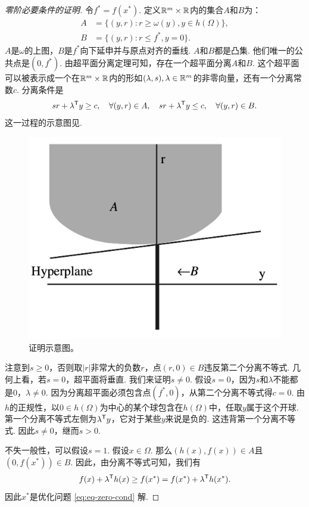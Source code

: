\begin{proof}[零阶必要条件的证明]
令$f^\ast=f({x^\ast})$. 定义$\mathbb{R}^m\times\mathbb{R}$内的集合$A$和$B$为：
\begin{align*}
    A&=\{(y,r):r\ge \omega({y}),{y}\in h(\Omega)\},\\ 
    B&=\{(y,r):r\le f^\ast,y=0\}.
\end{align*}
$A$是$\omega$的上图，$B$是$f^\ast$向下延申并与原点对齐的垂线. $A$和$B$都是凸集. 他们唯一的公共点是$(0,f^\ast)$. 由超平面分离定理可知，存在一个超平面分离$A$和$B$. 这个超平面可以被表示成一个在$\mathbb{R}^m\times\mathbb{R}$内的形如$(\lambda,s),\lambda\in \mathbb{R}^{m}$的非零向量，还有一个分离常数$c$. 分离条件是$$sr+{\lambda^{\mathsf{T}} y}\ge c,\quad\forall(y,r)\in A,\quad sr+{\lambda^{\mathsf{T}} y}\le c,\quad\forall(y,r)\in B.$$ 
这一过程的示意图见.

\begin{figure}[ht]
    \centering
    \includegraphics[scale=0.3]{Chapters/duality/figures/sep-hyperplane-eq.png}
    \caption{证明示意图。}
    \label{fig:sep-hyperplane-eq}
\end{figure}

注意到$s\ge 0$，否则取$|r|$非常大的负数$r$，点$(r,{0})\in B$违反第二个分离不等式. 几何上看，若$s=0$，超平面将垂直. 我们来证明$s\neq 0$. 假设$s=0$，因为$s$和${\lambda}$不能都是$0$，${\lambda\neq 0}$. 因为分离超平面必须包含点$(f^\ast,{0})$，从第二个分离不等式得$c=0$. 由$h$的正规性，以${0\in h(\Omega)}$为中心的某个球包含在$h(\Omega)$中，任取$y$属于这个开球. 第一个分离不等式左侧为${\lambda^{\mathsf{T}} y}$，它对于某些${y}$来说是负的. 这违背第一个分离不等式. 因此$s\neq 0$，继而$s>0$. 

不失一般性，可以假设$s=1$. 假设$x\in\Omega$. 那么$(h(x),f(x))\in A$且$(0,f(x^\ast))\in B$. 因此，由分离不等式可知，我们有$$f({x})+{\lambda^{\mathsf{T}} h(x)}\ge f({x^\ast})=f({x^\ast})+{\lambda^{\mathsf{T}} h(x^\ast)}.$$ 因此${x^\ast}$是优化问题 \eqref{eq:eq-zero-cond} 解. 
\end{proof}


